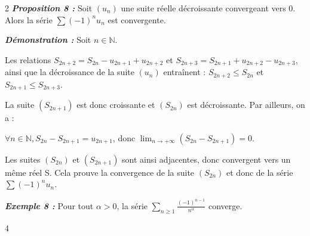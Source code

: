\documentclass[10pt,a4paper]{article}
\begin{document}
\begin{multicols}{2}
\textbf{\textit{Proposition 8 :}} Soit $(u_n)$ une suite réelle décroissante convergeant vers 0. Alors la série $\sum (-1)^n u_n$ est convergente.

\textbf{\textit{Démonstration :}} Soit $n \in \mathbb{N}$.

Les relations $S_{2n+2} = S_{2n} - u_{2n+1} + u_{2n+2}$ et $S_{2n+3} = S_{2n+1} + u_{2n+2} - u_{2n+3}$, ainsi que la décroissance de la suite $(u_n)$ entraînent : $S_{2n+2} \le S_{2n}$ et $S_{2n+1} \le S_{2n+3}$.

La suite $(S_{2n+1})$ est donc croissante et $(S_{2n})$ est décroissante. Par ailleurs, on a :

$\forall n \in \mathbb{N}, S_{2n} - S_{2n+1} = u_{2n+1}$, donc $\lim_{n \to +\infty} (S_{2n} - S_{2n+1}) = 0$.

Les suites $(S_{2n})$ et $(S_{2n+1})$ sont ainsi adjacentes, donc convergent vers un même réel S. Cela prouve la convergence de la suite $(S_{2n})$ et donc de la série $\sum (-1)^n u_n$.

\textbf{\textit{Exemple 8 :}} Pour tout $\alpha > 0$, la série $\sum_{n \ge 1} \frac{(-1)^{n-1}}{n^\alpha}$ converge.

\vfill
\centerline{\footnotesize 4}

\end{multicols}

\newpage
\end{document}
